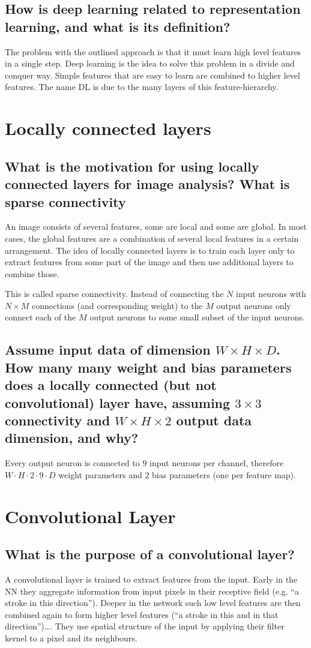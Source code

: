 \subsection{How is deep learning related to representation learning, and what is its definition?}
The problem with the outlined approach is that it must learn high level features in a single step. Deep learning is the idea to solve this problem in a divide and conquer way. 
Simple features that are easy to learn are combined to higher level features. The name DL is due to the many layers of this feature-hierarchy.
%
\section{Locally connected layers}
\subsection{What is the motivation for using locally connected layers for image analysis? What is sparse connectivity}
An image consists of several features, some are local and some are global. In most cases, the global features are a combination of several local features in a certain arrangement.
The idea of locally connected layers is to train each layer only to extract features from some part of the image and then use additional layers to combine those. 

This is called sparse connectivity. Instead of connecting the $N$ input neurons with $N\times M$ connections (and corresponding weight) to the $M$ output neurons only connect each of the $M$ output neurons to some small subset of the input neurons. 
\subsection{Assume input data of dimension $W \times H \times D$. How many many weight and bias parameters does a locally connected (but not convolutional) layer have, assuming $3 \times 3$ connectivity and $W \times H \times 2$ output data dimension, and why?}
Every output neuron is connected to $9$ input neurons per channel, therefore $W\cdot H\cdot 2 \cdot 9 \cdot D$ weight parameters and $2$ bias parameters (one per feature map).
%
\section{Convolutional Layer}
\subsection{What is the purpose of a convolutional layer?}
A convolutional layer is trained to extract features from the input. Early in the NN they aggregate information from input pixels in their receptive field (e.g. ``a stroke in this direction''). Deeper in the network such low level features are then combined again to form higher level features (``a stroke in this and in that direction'')\ldots.
They use spatial structure of the input by applying their filter kernel to a pixel and its neighbours. 
